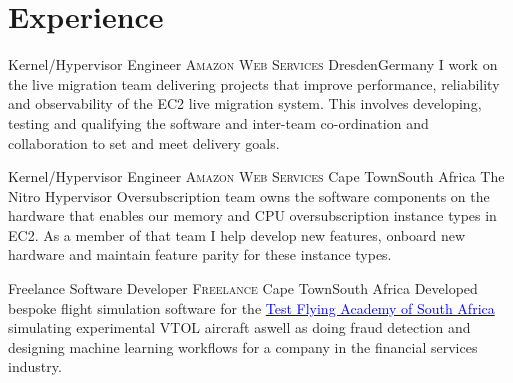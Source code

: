 \documentclass[10pt,a4paper,sans]{moderncv}
\begin{document}


\section{Experience}

{Kernel/Hypervisor Engineer}
{\textsc{Amazon Web Services}}
{\newline Dresden}{Germany}
{I work on the live migration team delivering projects that improve
performance, reliability and observability of the EC2 live migration system.
This involves developing, testing and qualifying the software and inter-team
co-ordination and collaboration to set and meet delivery goals.}

\cventry{
	2024
	\newline \vspace{1mm} \newline
}
{Kernel/Hypervisor Engineer}
{\textsc{Amazon Web Services}}
{\newline Cape Town}{South Africa}
{The Nitro Hypervisor Oversubscription team owns the software components on the
hardware that enables our memory and CPU oversubscription instance types in
EC2. As a member of that team I help develop new features, onboard new hardware
and maintain feature parity for these instance types.}

\cventry{2023\newline}
{Freelance Software Developer}
{\textsc{Freelance}}
{\newline Cape Town}{South Africa}
{Developed bespoke flight simulation software for the
\href{https://www.tfasa.com/}{\textcolor{blue}{Test Flying Academy of South
Africa}} simulating experimental VTOL aircraft aswell as doing fraud detection
and designing machine learning workflows for a company in the financial services
industry.}
\end{document}

